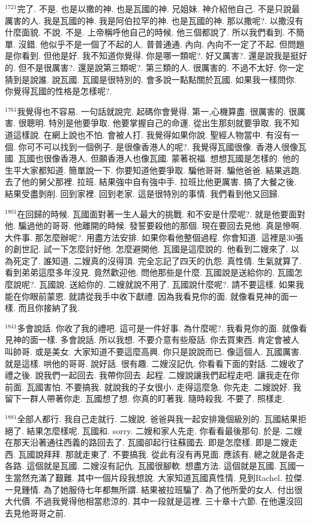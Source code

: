 \documentclass{book}
\begin{document}
$^{1721}$完了.
不是.
也是以撒的神.
也是瓦國的神.
兄姐妹.
神介紹他自己.
不是只說最厲害的人.
我是瓦國的神.
我是阿伯拉罕的神.
也是瓦國的神.
那以撒呢?.
以撒沒有什麼面貌.
不說.
不是.
上帝稱呼他自己的時候.
他三個都說了.
所以我們看到.
不簡單.
沒錯.
他似乎不是一個了不起的人.
普普通通.
內向.
內向不一定了不起.
但問題是你看到.
但他是好.
我不知道你覺得.
你是哪一類呢?.
好又厲害?.
還是說我是挺好的.
但不是很厲害?.
還是說第三類呢?.
第三類的人.
很厲害的.
不過不太好.
你一定猜到是說誰.
說瓦國.
瓦國是很特別的.
會多說一點點關於瓦國.
如果我一樣問你.
你覺得瓦國的性格是怎樣呢?.

$^{1761}$我覺得也不容易.
一句話就說完.
起碼你會覺得.
第一,心機算盡.
很厲害的.
很厲害.
很聰明.
特別是他要爭取.
他要掌握自己的命運.
從出生那刻就要爭取.
我不知道這樣說.
在網上說也不怕.
會被人打.
我覺得如果你說.
聖經人物當中.
有沒有一個.
你可不可以找到一個例子.
是很像香港人的呢?.
我覺得瓦國很像.
香港人很像瓦國.
瓦國也很像香港人.
但願香港人也像瓦國.
蒙著祝福.
想想瓦國是怎樣的.
他的生平大家都知道.
簡單說一下.
你要知道他要爭取.
騙他哥哥.
騙他爸爸.
結果逃跑.
去了他的舅父那裡.
拉班.
結果強中自有強中手.
拉班比他更厲害.
搞了大餐之後.
結果受盡剝削.
回到家裡.
回到老家.
這是很特別的事情.
我們看到他又回歸.

$^{1801}$在回歸的時候.
瓦國面對著一生人最大的挑戰.
和不安是什麼呢?.
就是他要面對他.
騙過他的哥哥.
他離開的時候.
發誓要殺他的那個.
現在要回去見他.
真是慘啊.
大件事.
那怎麼辦呢?.
用盡方法安排.
如果你看他整個過程.
你會知道.
這裡是30張的創世記.
試一下怎麼討好他.
怎麼避開他.
瓦國是這麼說的.
他看到二嫂來了.
以為死定了.
誰知道.
二嫂真的沒得頂.
完全忘記了四天的仇怨.
真性情.
生氣就算了.
看到弟弟這麼多年沒見.
竟然歡迎他.
問他那些是什麼.
瓦國說是送給你的.
瓦國怎麼說呢?.
瓦國說.
送給你的.
二嫂就說不用了.
瓦國說什麼呢?.
請不要這樣.
如果我能在你眼前蒙恩.
就請從我手中收下獻禮.
因為我看見你的面.
就像看見神的面一樣.
而且你接納了我.

$^{1841}$多會說話.
你收了我的禮吧.
這可是一件好事.
為什麼呢?.
我看見你的面.
就像看見神的面一樣.
多會說話.
所以我想.
不要介意有些廢話.
你去買東西.
肯定會被人叫帥哥.
或是美女.
大家知道不要這麼高興.
你只是說說而已.
像這個人.
瓦國厲害.
就是這樣.
哄他的哥哥.
說好話.
很有趣.
二嫂沒記仇.
你看看下面的對話.
二嫂收了禮之後.
說我們一起回去.
我帶你回去.
起程.
二嫂說讓我們起程走吧.
讓我走在你前面.
瓦國害怕.
不要搞我.
就說我的子女很小.
走得這麼急.
你先走.
二嫂說好.
我留下一群人帶著你走.
瓦國想了想.
你真的盯著我.
隨時殺我.
不要了.
照樣走.

$^{1881}$全部人都行.
我自己走就行.
二嫂說.
爸爸與我一起安排幾個級別的.
瓦國結果拒絕了.
結果怎麼樣呢.
瓦國和.
sorry.
二嫂和家人先走.
你看看最後那句.
於是.
二嫂在那天沿著通往西義的路回去了.
瓦國卻起行往蘇國去.
即是怎麼樣.
即是二嫂走西.
瓦國說拜拜.
那就走東了.
不要搞我.
從此有沒有再見面.
應該有.
總之就是各走各路.
這個就是瓦國.
二嫂沒有記仇.
瓦國很腳軟.
想盡方法.
這個就是瓦國.
瓦國一生當然充滿了艱難.
其中一個片段我想說.
大家知道瓦國真性情.
見到Rachel.
拉傑.
一見鍾情.
為了她服侍七年都無所謂.
結果被拉班騙了.
為了他所愛的女人.
付出很大代價.
不過我覺得他相當悲涼的.
其中一段就是這裡.
三十章十六節.
在他還沒回去見他哥哥之前.
\end{document}
